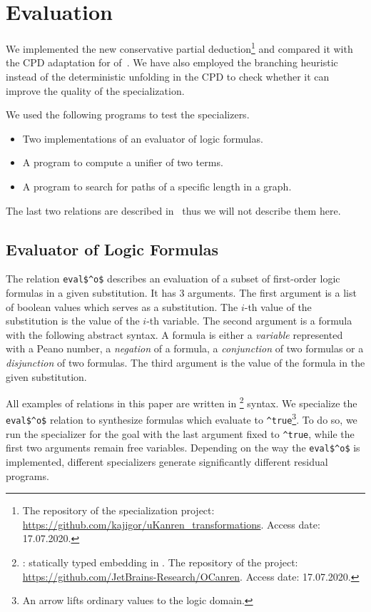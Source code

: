 \section{Evaluation}

We implemented the new conservative partial deduction\footnote{The repository of the \mk{} specialization project: \url{https://github.com/kajigor/uKanren_transformations}. Access date: 17.07.2020.} and compared it with the CPD adaptation for \mk{} of~\cite{lozov2019relational}.
We have also employed the branching heuristic instead of the deterministic unfolding in the CPD to check whether it can improve the quality of the specialization.

We used the following programs to test the specializers.
\begin{itemize}
  \item Two implementations of an evaluator of logic formulas.
  \item A program to compute a unifier of two terms.
  \item A program to search for paths of a specific length in a graph.
\end{itemize}

The last two relations are described in~\cite{lozov2019relational} thus we will not describe them here.


\subsection{Evaluator of Logic Formulas}

The relation \lstinline{eval$^o$} describes an evaluation of a subset of first-order logic formulas in a given substitution.
It has 3 arguments.
The first argument is a list of boolean values which serves as a substitution.
The $i$-th value of the substitution is the value of the $i$-th variable.
The second argument is a formula with the following abstract syntax.
A formula is either a \emph{variable} represented with a Peano number, a \emph{negation} of a formula, a \emph{conjunction} of two formulas or a \emph{disjunction} of two formulas.
The third argument is the value of the formula in the given substitution.

All examples of \mk{} relations in this paper are written in \oc{}\footnote{\oc{}: statically typed \mk{} embedding in \ocaml{}. The repository of the project: \url{https://github.com/JetBrains-Research/OCanren}. Access date: 17.07.2020.} syntax.
We specialize the \lstinline{eval$^o$} relation to synthesize formulas which evaluate to \lstinline{^true}\footnote{An arrow lifts ordinary values to the logic domain.}.
To do so, we run the specializer for the goal with the last argument fixed to \lstinline{^true}, while the first two arguments remain free variables.
Depending on the way the \lstinline{eval$^o$} is implemented, different specializers generate significantly different residual programs.

